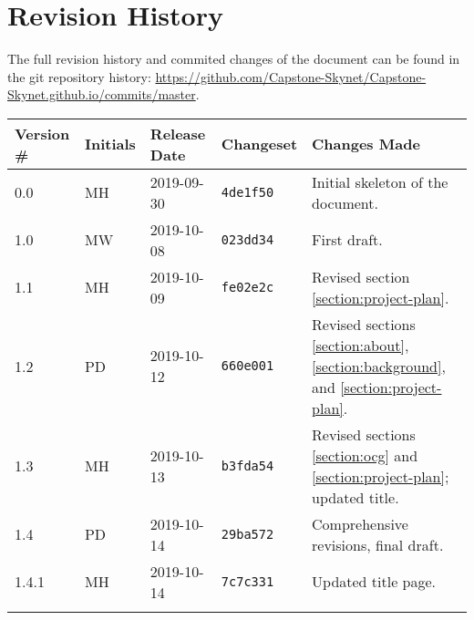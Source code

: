 \thispagestyle{empty}
\section*{Revision History}
The full revision history and commited changes of the document can be found in the git repository history: \href{https://github.com/Capstone-Skynet/Capstone-Skynet.github.io}{https://github.com/Capstone-Skynet/Capstone-Skynet.github.io/commits/master}.

\begin{table}[H]
\begin{tabular}{*{5}{l}}
\hline
Version \# & Initials & Release Date & Changeset & Changes Made \\ \hline

0.0 & MH & 2019-09-30 & \texttt{4de1f50} & Initial skeleton of the document.\\
1.0 & MW & 2019-10-08 & \texttt{023dd34} & First draft.\\
1.1 & MH & 2019-10-09 & \texttt{fe02e2c} & Revised section \ref{section:project-plan}.\\
1.2 & PD & 2019-10-12 & \texttt{660e001} & Revised sections \ref{section:about}, \ref{section:background}, and \ref{section:project-plan}.\\
1.3 & MH & 2019-10-13 & \texttt{b3fda54} & Revised sections \ref{section:ocg} and \ref{section:project-plan}; updated title.\\
1.4 & PD & 2019-10-14 & \texttt{29ba572} & Comprehensive revisions, final draft.\\
1.4.1 & MH & 2019-10-14 & \texttt{7c7c331} & Updated title page. \\

 & & & \\ \hline
\end{tabular}
\end{table}
